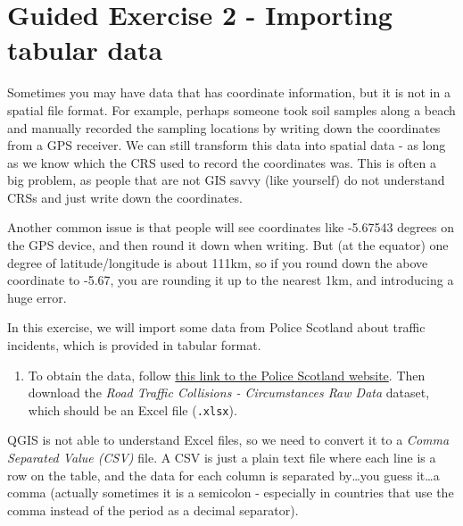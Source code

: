 \documentclass[
  letterpaper,
  DIV=11,
  numbers=noendperiod]{scrreprt}
\providecommand{\tightlist}{%
  \setlength{\itemsep}{0pt}\setlength{\parskip}{0pt}}\usepackage{longtable,booktabs,array}
\begin{document}
\section{Guided Exercise 2 - Importing tabular
data}\label{guided-exercise-2---importing-tabular-data}

Sometimes you may have data that has coordinate information, but it is
not in a spatial file format. For example, perhaps someone took soil
samples along a beach and manually recorded the sampling locations by
writing down the coordinates from a GPS receiver. We can still transform
this data into spatial data - as long as we know which the CRS used to
record the coordinates was. This is often a big problem, as people that
are not GIS savvy (like yourself) do not understand CRSs and just write
down the coordinates.

Another common issue is that people will see coordinates like -5.67543
degrees on the GPS device, and then round it down when writing. But (at
the equator) one degree of latitude/longitude is about 111km, so if you
round down the above coordinate to -5.67, you are rounding it up to the
nearest 1km, and introducing a huge error.

In this exercise, we will import some data from Police Scotland about
traffic incidents, which is provided in tabular format.

\begin{enumerate}
\def\labelenumi{(\arabic{enumi})}
\setcounter{enumi}{312}
\tightlist
\item
  To obtain the data, follow
  \href{https://www.scotland.police.uk/about-us/how-we-do-it/road-traffic-collision-data/}{this
  link to the Police Scotland website}. Then download the \emph{Road
  Traffic Collisions - Circumstances Raw Data} dataset, which should be
  an Excel file (\texttt{.xlsx}).
\end{enumerate}

QGIS is not able to understand Excel files, so we need to convert it to
a \emph{Comma Separated Value (CSV)} file. A CSV is just a plain text
file where each line is a row on the table, and the data for each column
is separated by\ldots you guess it\ldots a comma (actually sometimes it
is a semicolon - especially in countries that use the comma instead of
the period as a decimal separator).
\end{document}
